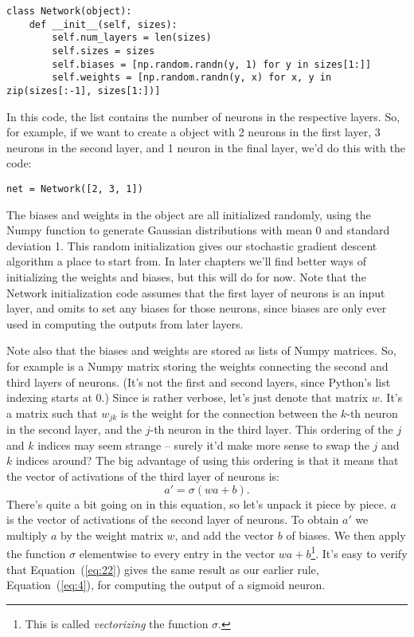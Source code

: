\documentclass[a4paper,twoside,10pt]{book}
\begin{document}
\begin{lstlisting}
class Network(object):
	def __init__(self, sizes):
		self.num_layers = len(sizes)
		self.sizes = sizes
		self.biases = [np.random.randn(y, 1) for y in sizes[1:]]
		self.weights = [np.random.randn(y, x) for x, y in zip(sizes[:-1], sizes[1:])]
\end{lstlisting}
In this code, the list  contains the number of neurons in the respective layers. So, for example, if we want to create a  object with 2 neurons in the first layer, 3 neurons in the second layer, and 1 neuron in the final layer, we'd do this with the code:

\begin{lstlisting}
net = Network([2, 3, 1])
\end{lstlisting}
The biases and weights in the  object are all initialized randomly, using the Numpy  function to generate Gaussian distributions with mean 0 and standard deviation 1. This random initialization gives our stochastic gradient descent algorithm a place to start from. In later chapters we'll find better ways of initializing the weights and biases, but this will do for now. Note that the Network initialization code assumes that the first layer of neurons is an input layer, and omits to set any biases for those neurons, since biases are only ever used in computing the outputs from later layers.

Note also that the biases and weights are stored as lists of Numpy matrices. So, for example  is a Numpy matrix storing the weights connecting the second and third layers of neurons. (It's not the first and second layers, since Python's list indexing starts at 0.) Since  is rather verbose, let's just denote that matrix $w$. It's a matrix such that $w_{jk}$ is the weight for the connection between the $k$-th neuron in the second layer, and the $j$-th neuron in the third layer. This ordering of the $j$ and $k$ indices may seem strange -- surely it'd make more sense to swap the $j$ and $k$ indices around? The big advantage of using this ordering is that it means that the vector of activations of the third layer of neurons is:
\begin{equation}
	a' = \sigma(w a + b).
	\tag{22}\label{eq:22}
\end{equation}
There's quite a bit going on in this equation, so let's unpack it piece by piece. $a$ is the vector of activations of the second layer of neurons. To obtain $a'$ we multiply $a$ by the weight matrix $w$, and add the vector $b$ of biases. We then apply the function $\sigma$ elementwise to every entry in the vector $wa+b$\footnote{This is called \textit{vectorizing} the function $\sigma$.}. It's easy to verify that Equation~(\ref{eq:22}) gives the same result as our earlier rule, Equation~(\ref{eq:4}), for computing the output of a sigmoid neuron.
\end{document}
